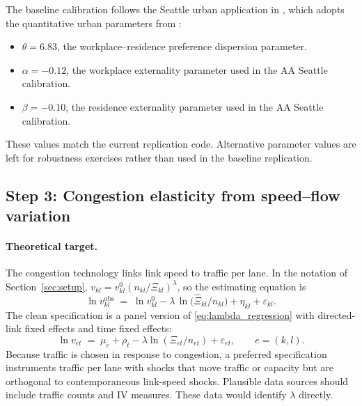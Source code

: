 \documentclass[12pt]{article}
\newcommand{\obs}{\mathrm{obs}}
\begin{document}
The baseline calibration follows the Seattle urban application in
\citet{AllenArkolakis2022}, which adopts the quantitative urban
parameters from \citet{Ahlfeldt2015}:
\begin{itemize}[leftmargin=2em,itemsep=0.2em]
	\item $\theta=6.83$, the workplace--residence preference dispersion
	parameter.
	\item $\alpha=-0.12$, the workplace externality parameter used in
	the AA Seattle calibration.
	\item $\beta=-0.10$, the residence externality parameter used in
	the AA Seattle calibration.
\end{itemize}
These values match the current replication code.  Alternative
parameter values are left for robustness exercises rather than used
in the baseline replication.



\subsection{Step 3: Congestion elasticity from speed--flow variation}
\label{ssec:lambda_est}

\paragraph{Theoretical target.}
The congestion technology links link speed to traffic per lane.  In
the notation of Section~\ref{sec:setup},
$v_{kl}=v^{0}_{kl}(n_{kl}/\Xi_{kl})^{\lambda}$, so the estimating
equation is
\begin{equation}
  \ln v_{kl}^{\obs}
  \;=\;
  \ln v_{kl}^{0}
  -\lambda\,\ln\!\bigl(\hat\Xi_{kl}/n_{kl}\bigr)
  +\eta_{kl}
  +\varepsilon_{kl}.
  \label{eq:lambda_regression}
\end{equation}
The clean specification is a panel version of \eqref{eq:lambda_regression}
with directed-link fixed effects and time fixed effects:
\begin{equation}
  \ln v_{e t}
  \;=\;
  \mu_e+\rho_t-\lambda\ln(\Xi_{e t}/n_{e t})+\varepsilon_{e t},
  \qquad e=(k,l).
  \label{eq:lambda_panel}
\end{equation}
Because traffic is chosen in response to congestion, a preferred
specification instruments traffic per lane with shocks that move
traffic or capacity but are orthogonal to contemporaneous link-speed
shocks.  Plausible data sources should include traffic counts and IV
measures.  These data would identify $\lambda$ directly.
\end{document}
